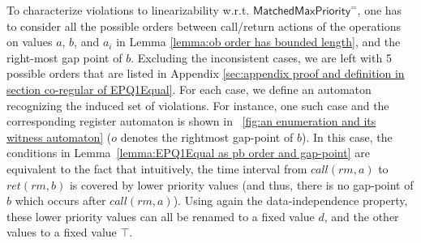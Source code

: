 To characterize violations to linearizability w.r.t. $\mathsf{MatchedMaxPriority}^{=}$, one has to consider all the possible orders between call/return actions of the operations on values $a$, $b$, and $a_i$ in Lemma \ref{lemma:ob order has bounded length}, and the right-most gap point of $b$. Excluding the inconsistent cases, we are left with 5 possible orders that are listed in Appendix \ref{sec:appendix proof and definition in section co-regular of EPQ1Equal}. For each case, we define an automaton recognizing the induced set of violations. For instance, one such case and the corresponding register automaton is shown in \figurename~\ref{fig:an enumeration and its witness automaton} ($o$ denotes the rightmost gap-point of $b$). In this case, the conditions in Lemma~\ref{lemma:EPQ1Equal as pb order and gap-point} are equivalent to the fact that intuitively, the time interval from $\textit{call}(\textit{rm},a)$ to $\textit{ret}(\textit{rm},b)$ is covered by lower priority values (and thus, there is no gap-point of $b$ which occurs after $\textit{call}(\textit{rm},a)$). Using again the data-independence property, these lower priority values can all be renamed to a fixed value $d$, and the other values to a fixed value $\top$.


